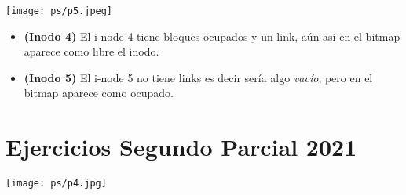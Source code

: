 \documentclass[openany]{book}
\begin{document}
\texttt{[image: ps/p5.jpeg]}

\begin{rta}
    \begin{itemize}
        \item \textbf{(Inodo 4)} El i-node 4 tiene bloques ocupados y un link, aún así en el bitmap aparece como libre el inodo.
        \item \textbf{(Inodo 5)} El i-node 5 no tiene links es decir sería algo \textit{vacío}, pero en el bitmap aparece como ocupado.
    \end{itemize}    
\end{rta}


\section*{Ejercicios Segundo Parcial 2021}
\texttt{[image: ps/p4.jpg]}
\end{document}
